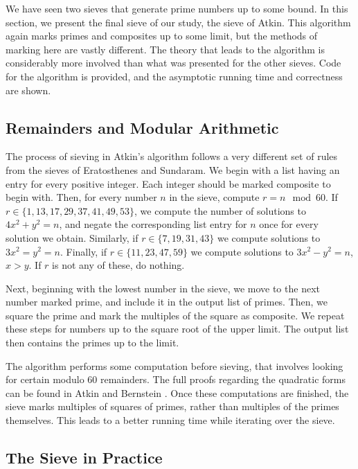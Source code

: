 \documentclass{amsart}
\theoremstyle{definition}
\theoremstyle{case}
\begin{document}
	We have seen two sieves that generate prime numbers up to some bound. In this section, we present the final sieve of our study, the sieve of Atkin. This algorithm again marks primes and composites up to some limit, but the methods of marking here are vastly different. The theory that leads to the algorithm is considerably more involved than what was presented for the other sieves. Code for the algorithm is provided, and the asymptotic running time and correctness are shown.
	
	\subsection{Remainders and Modular Arithmetic}
	
	The process of sieving in Atkin's algorithm follows a very different set of rules from the sieves of Eratosthenes and Sundaram. We begin with a list having an entry for every positive integer. Each integer should be marked composite to begin with. Then, for every number $n$ in the sieve, compute $r = n \mod 60$. If $r \in \{1, 13, 17, 29, 37, 41, 49, 53\}$, we compute the number of solutions to $4x^2 + y^2 = n$, and negate the corresponding list entry for $n$ once for every solution we obtain. Similarly, if $r \in \{7, 19, 31, 43\}$ we compute solutions to $3x^2 = y^2 = n$. Finally, if $r \in \{11, 23, 47, 59\}$ we compute solutions to $3x^2 - y^2 = n$, $x>y$. If $r$ is not any of these, do nothing.
	
	Next, beginning with the lowest number in the sieve, we move to the next number marked prime, and include it in the output list of primes. Then, we square the prime and mark the multiples of the square as composite. We repeat these steps for numbers up to the square root of the upper limit. The output list then contains the primes up to the limit.
	
	The algorithm performs some computation before sieving, that involves looking for certain modulo 60 remainders. The full proofs regarding the quadratic forms can be found in Atkin and Bernstein \cite[p.~1028]{MR2031423}. Once these computations are finished, the sieve marks multiples of squares of primes, rather than multiples of the primes themselves. This leads to a better running time while iterating over the sieve.
	
	\subsection{The Sieve in Practice}
	
\end{document}
